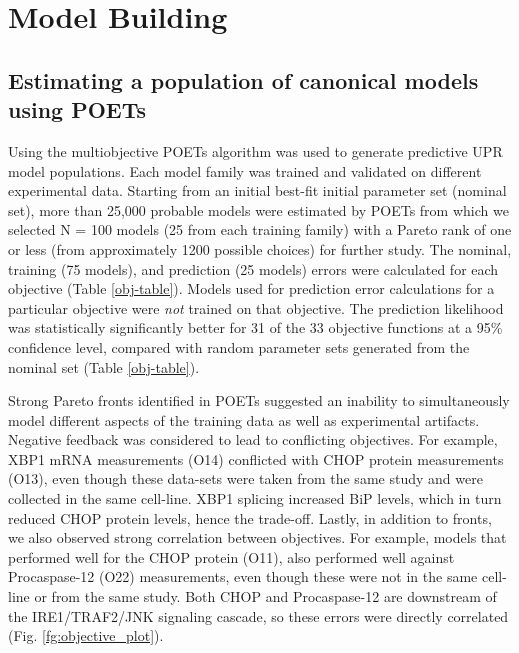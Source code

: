 \documentclass[fleqn,10pt]{wlscirep}
\begin{document}
\section*{Model Building}
\subsection*{Estimating a population of canonical models using POETs}
Using the multiobjective POETs algorithm was used to generate predictive UPR model populations.  Each model family was trained and validated on different experimental data. Starting from an initial best-fit initial parameter set (nominal set), more than 25,000 probable models were estimated by POETs from which we selected N = 100 models (25 from each training family) with a Pareto rank of one or less (from approximately 1200 possible choices) for further study. The nominal, training (75 models), and prediction (25 models) errors were calculated for each objective (Table \ref{obj-table}). Models used for prediction error calculations for a particular objective were \emph{not} trained on that objective. The prediction likelihood was statistically significantly better for 31 of the 33 objective functions at a 95\% confidence level, compared with random parameter sets generated from the nominal set (Table \ref{obj-table}).

Strong Pareto fronts identified in POETs suggested an inability to simultaneously model different aspects of the training data as well as experimental artifacts. Negative feedback was considered to lead to conflicting objectives. For example, XBP1 mRNA measurements (O14) conflicted with CHOP protein measurements (O13), even though these data-sets were taken from the same study and were collected in the same cell-line. XBP1 splicing increased BiP levels, which in turn reduced CHOP protein levels, hence the trade-off. Lastly, in addition to fronts, we also observed strong correlation between objectives. For example, models that performed well for the CHOP protein (O11), also performed well against Procaspase-12 (O22) measurements, even though these were not in the same cell-line or from the same study. Both CHOP and Procaspase-12 are downstream of the IRE1/TRAF2/JNK signaling cascade, so these errors were directly correlated  (Fig. \ref{fg:objective_plot}).
\end{document}
